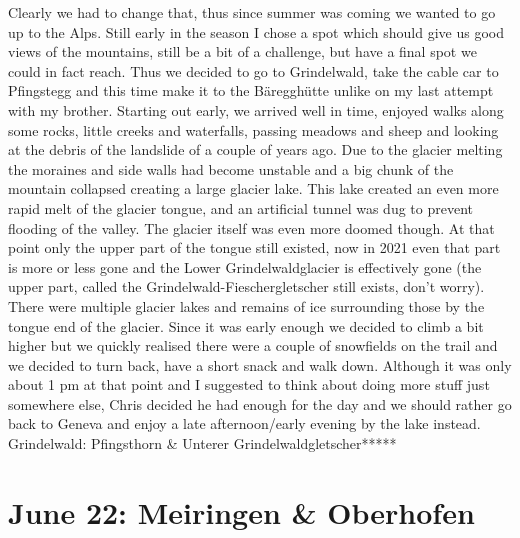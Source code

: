 Clearly we had to change that, thus since summer was coming we wanted to go up to the Alps. Still early in the season I chose a spot which should give us good views of the mountains, still be a bit of a challenge, but have a final spot we could in fact reach. Thus we decided to go to Grindelwald, take the cable car to Pfingstegg and this time make it to the B\"areggh\"utte unlike on my last attempt with my brother. Starting out early, we arrived well in time, enjoyed walks along some rocks, little creeks and waterfalls, passing meadows and sheep and looking at the debris of the landslide of a couple of years ago. Due to the glacier melting the moraines and side walls had become unstable and a big chunk of the mountain collapsed creating a large glacier lake. This lake created an even more rapid melt of the glacier tongue, and an artificial tunnel was dug to prevent flooding of the valley. The glacier itself was even more doomed though. At that point only the upper part of the tongue still existed, now in 2021 even that part is more or less gone and the Lower Grindelwaldglacier is effectively gone (the upper part, called the Grindelwald-Fieschergletscher still exists, don't worry). There were multiple glacier lakes and remains of ice surrounding those by the tongue end of the glacier. Since it was early enough we decided to climb a bit higher but we quickly realised there were a couple of snowfields on the trail and we decided to turn back, have a short snack and walk down. Although it was only about 1 pm at that point and I suggested to think about doing more stuff just somewhere else, Chris decided he had enough for the day and we should rather go back to Geneva and enjoy a late afternoon/early evening by the lake instead.\\

Grindelwald: Pfingsthorn \& Unterer Grindelwaldgletscher*****

\section{June 22: Meiringen \& Oberhofen}
\label{Meiringen2014}

